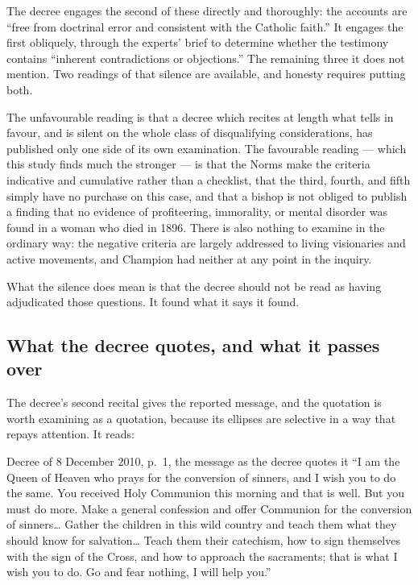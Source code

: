 The decree engages the second of these directly and thoroughly: the
accounts are ``free from doctrinal error and consistent with the
Catholic faith.'' It engages the first obliquely, through the experts'
brief to determine whether the testimony contains ``inherent
contradictions or objections.'' The remaining three it does not
mention. Two readings of that silence are available, and honesty
requires putting both.

The unfavourable reading is that a decree which recites at length what
tells in favour, and is silent on the whole class of disqualifying
considerations, has published only one side of its own examination.
The favourable reading --- which this study finds much the stronger ---
is that the Norms make the criteria indicative and cumulative rather
than a checklist, that the third, fourth, and fifth simply have no
purchase on this case, and that a bishop is not obliged to publish a
finding that no evidence of profiteering, immorality, or mental
disorder was found in a woman who died in 1896. There is also nothing
to examine in the ordinary way: the negative criteria are largely
addressed to living visionaries and active movements, and Champion had
neither at any point in the inquiry.

What the silence does mean is that the decree should not be read as
having adjudicated those questions. It found what it says it found.

\subsection{What the decree quotes, and what it passes over}

The decree's second recital gives the reported message, and the
quotation is worth examining as a quotation, because its ellipses are
selective in a way that repays attention. It reads:

\begin{witnesstext}{Decree of 8 December 2010, p.~1, the message as the
decree quotes it}
``I am the Queen of Heaven who prays for the conversion of sinners, and
I wish you to do the same. You received Holy Communion this morning and
that is well. But you must do more. Make a general confession and offer
Communion for the conversion of sinners\dots{} Gather the children in
this wild country and teach them what they should know for
salvation\dots{} Teach them their catechism, how to sign themselves
with the sign of the Cross, and how to approach the sacraments; that is
what I wish you to do. Go and fear nothing, I will help
you.''
\end{witnesstext}

